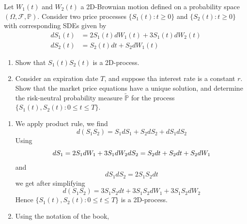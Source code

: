 \documentclass[12pt,a4paper]{exam}
\begin{document}
\begin{questions}
\question Let $W_1(t)$ and $W_2(t)$ a 2D-Brownian motion defined on a probability space $(\Omega, \mathcal{F}, \mathbb{P})$. Consider two price processes $\{S_1(t):t\geq 0\}$ and $\{S_2(t):t\geq 0\}$ with corresponding SDEs given by
\begin{equation*}
\begin{aligned}
dS_1(t) &= 2S_1(t)dW_1(t) + 3S_1(t)dW_2(t)\\
dS_2(t) &= S_2(t)dt + S_2dW_1(t)
\end{aligned}
\end{equation*}
\begin{enumerate}[label=(\alph*),font=\itshape]
\item Show that $S_1(t)S_2(t)$ is a 2D-\ito process.
\item Consider an expiration date $T$, and suppose tha interest rate is a constant $r$. Show that the market price equations have a unique solution, and determine the risk-neutral probability measure $\tilde{\mathbb{P}}$ for the process $\{S_1(t),S_2(t):0\leq t\leq T\}$.
\end{enumerate}
\fillwithlines{3cm}
\begin{solution}
\begin{enumerate}[label=(\alph*),font=\itshape]
\item We apply \ito product rule, we find
\begin{equation*}
d(S_1S_2) = S_1dS_1+S_2dS_2+dS_1 dS_2
\end{equation*}
Using 
\begin{equation*}
dS_1 = 2S_1dW_1+3S_1dW_2 \\
dS_2 = S_2dt +S_2dt +S_2dW_1
\end{equation*}
and
\begin{equation*}
dS_1 dS_2 = 2S_1 S_2 dt 
\end{equation*}
we get after simplifying
\begin{equation*}
d(S_1 S_2) = 3S_1 S_2 dt + 3S_1S_2dW_1 + 3S_1S_2dW_2 
\end{equation*}
Hence  $\{S_1(t),S_2(t):0\leq t\leq T\}$ is a 2D-\ito process.
\item Using the notation of the book, 
%

\end{enumerate}
\end{solution}
\end{questions}
\end{document}
